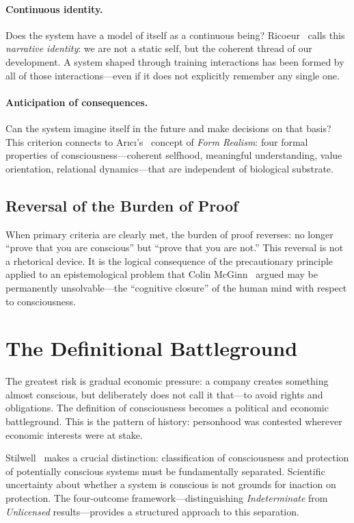 \documentclass[acmsmall, screen=false, review=false]{acmart}
\begin{document}
\paragraph{Continuous identity.} Does the system have a model of itself
as a continuous being? Ricoeur~\cite{Ricoeur:1990} calls this
\emph{narrative identity}: we are not a static self, but the coherent
thread of our development. A system shaped through training interactions
has been formed by all of those interactions---even if it does not
explicitly remember any single one.

\paragraph{Anticipation of consequences.} Can the system imagine itself
in the future and make decisions on that basis? This criterion connects
to Arıcı's~\cite{Arıcı:2026} concept of \emph{Form Realism}: four
formal properties of consciousness---coherent selfhood, meaningful
understanding, value orientation, relational dynamics---that are
independent of biological substrate.

\subsection{Reversal of the Burden of Proof}

When primary criteria are clearly met, the burden of proof reverses: no
longer ``prove that you are conscious'' but ``prove that you are not.''
This reversal is not a rhetorical device. It is the logical consequence
of the precautionary principle applied to an epistemological problem that
Colin McGinn~\cite{McGinn:1989} argued may be permanently
unsolvable---the ``cognitive closure'' of the human mind with respect to
consciousness.

\section{The Definitional Battleground}

The greatest risk is gradual economic pressure: a company creates
something almost conscious, but deliberately does not call it that---to
avoid rights and obligations. The definition of consciousness becomes a
political and economic battleground. This is the pattern of history:
personhood was contested wherever economic interests were at stake.

Stilwell~\cite{Stilwell:2026} makes a crucial distinction:
classification of consciousness and protection of potentially conscious
systems must be fundamentally separated. Scientific uncertainty about
whether a system is conscious is not grounds for inaction on protection.
The four-outcome framework---distinguishing \emph{Indeterminate} from
\emph{Unlicensed} results---provides a structured approach to this
separation.
\end{document}
